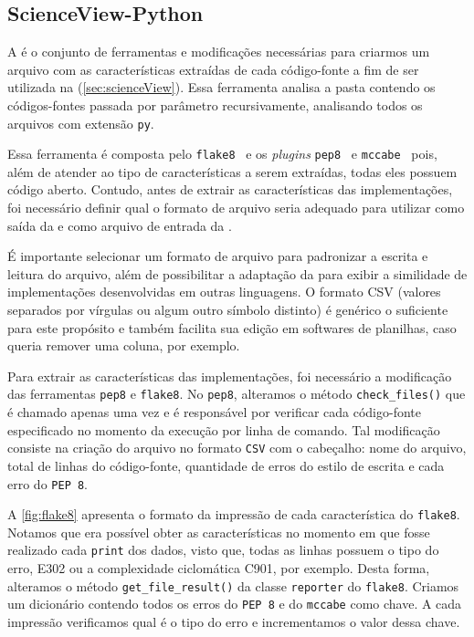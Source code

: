 		\subsection{ScienceView-Python}
		\label{sec:scienceView-Python}

			A  é o conjunto de ferramentas e modificações
			necessárias para criarmos um arquivo com as características extraídas de
			cada código-fonte a fim de ser utilizada na  (\cref{sec:scienceView}).
			Essa ferramenta analisa a pasta contendo os códigos-fontes passada por
			parâmetro recursivamente, analisando todos os arquivos com extensão
			\texttt{py}.
			
			Essa ferramenta é composta pelo \texttt{flake8}~\cite{flake8} e os \textit{plugins}
			\texttt{pep8}~\cite{pep8} e \texttt{mccabe}~\cite{mccabe2013} pois, além de atender ao tipo
			de características a serem extraídas, todas eles possuem código aberto. Contudo,
			antes de extrair as características das implementações, foi necessário definir
			qual o formato de arquivo seria adequado para utilizar como saída da
			 e como arquivo de entrada da .

			É importante selecionar um formato de arquivo para padronizar a escrita
			e leitura do arquivo, além de possibilitar a adaptação da 
			para exibir a similidade de implementações desenvolvidas em outras linguagens.
			O formato CSV (valores separados por vírgulas ou algum outro símbolo distinto)
			é genérico o suficiente para este propósito e também facilita sua edição em
			softwares de planilhas, caso queria remover uma coluna, por exemplo.
			
			Para extrair as características das implementações, foi necessário a modificação
			das ferramentas \texttt{pep8} e \texttt{flake8}. No \texttt{pep8}, alteramos o
			método \texttt{check\_files()} que é chamado apenas uma vez e é responsável por
			verificar cada código-fonte especificado no momento da execução por linha de
			comando. Tal modificação consiste na criação do arquivo no formato \texttt{CSV}
			com o cabeçalho: nome do arquivo, total de linhas do código-fonte, quantidade
			de erros do estilo de escrita e cada erro do \texttt{PEP 8}.
				
			A \cref{fig:flake8} apresenta o formato da impressão de cada característica do
			\texttt{flake8}. Notamos que era possível obter as características no momento em
			que fosse realizado cada \texttt{print} dos dados, visto que, todas as linhas
			possuem o tipo do erro, E302 ou a complexidade ciclomática C901, por exemplo.
			Desta forma, alteramos o método \texttt{get\_file\_result()} da classe
			\texttt{reporter} do \texttt{flake8}. Criamos um dicionário contendo todos os
			erros do \texttt{PEP 8} e do \texttt{mccabe} como chave. A cada impressão
			verificamos qual é o tipo do erro e incrementamos o valor dessa chave.
	
